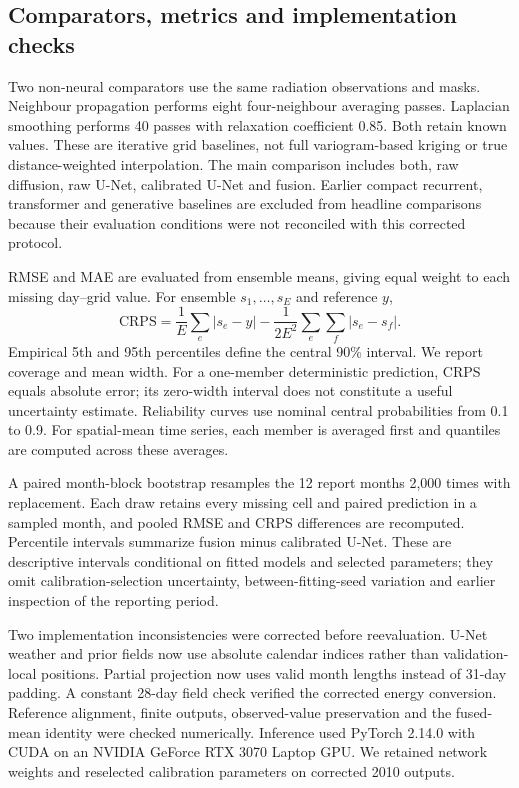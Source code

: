 \documentclass[preprint,12pt,authoryear]{elsarticle}
\begin{document}
\subsection{Comparators, metrics and implementation checks}
Two non-neural comparators use the same radiation observations and masks. Neighbour propagation performs eight four-neighbour averaging passes. Laplacian smoothing performs 40 passes with relaxation coefficient 0.85. Both retain known values. These are iterative grid baselines, not full variogram-based kriging or true distance-weighted interpolation. The main comparison includes both, raw diffusion, raw U-Net, calibrated U-Net and fusion. Earlier compact recurrent, transformer and generative baselines are excluded from headline comparisons because their evaluation conditions were not reconciled with this corrected protocol.

RMSE and MAE are evaluated from ensemble means, giving equal weight to each missing day--grid value. For ensemble $s_1,\ldots,s_E$ and reference $y$,
\begin{equation}
\mathrm{CRPS}=\frac{1}{E}\sum_e|s_e-y|-\frac{1}{2E^2}\sum_e\sum_f|s_e-s_f|.
\end{equation}
Empirical 5th and 95th percentiles define the central 90\% interval. We report coverage and mean width. For a one-member deterministic prediction, CRPS equals absolute error; its zero-width interval does not constitute a useful uncertainty estimate. Reliability curves use nominal central probabilities from 0.1 to 0.9. For spatial-mean time series, each member is averaged first and quantiles are computed across these averages.

A paired month-block bootstrap resamples the 12 report months 2,000 times with replacement. Each draw retains every missing cell and paired prediction in a sampled month, and pooled RMSE and CRPS differences are recomputed. Percentile intervals summarize fusion minus calibrated U-Net. These are descriptive intervals conditional on fitted models and selected parameters; they omit calibration-selection uncertainty, between-fitting-seed variation and earlier inspection of the reporting period.

Two implementation inconsistencies were corrected before reevaluation. U-Net weather and prior fields now use absolute calendar indices rather than validation-local positions. Partial projection now uses valid month lengths instead of 31-day padding. A constant 28-day field check verified the corrected energy conversion. Reference alignment, finite outputs, observed-value preservation and the fused-mean identity were checked numerically. Inference used PyTorch 2.14.0 with CUDA on an NVIDIA GeForce RTX 3070 Laptop GPU. We retained network weights and reselected calibration parameters on corrected 2010 outputs.
\end{document}
